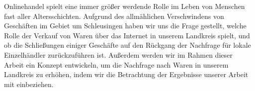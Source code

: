 Onlinehandel spielt eine immer größer werdende Rolle im Leben von Menschen fast aller Altersschichten. Aufgrund des allmählichen Verschwindens von Geschäften im Gebiet um Schleusingen haben wir uns die Frage gestellt, welche Rolle der Verkauf von Waren über das Internet in unserem Landkreis spielt, und ob die Schließungen einiger Geschäfte auf den Rückgang der Nachfrage für lokale Einzelhändler zurückzuführen ist.
Außerdem werden wir im Rahmen dieser Arbeit ein Konzept entwickeln, um die Nachfrage nach Waren in unserem Landkreis zu erhöhen, indem wir die Betrachtung der Ergebnisse unserer Arbeit mit einbeziehen.